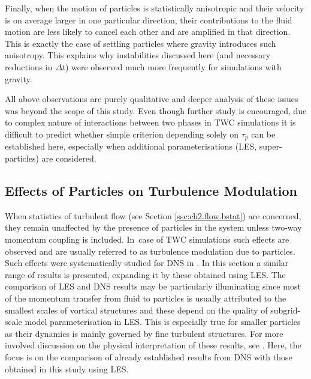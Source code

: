\documentclass{pracamgren}
\begin{document}
Finally, when the motion of particles is statistically anisotropic and their velocity is on average larger in one particular direction, their contributions to the fluid motion are less likely to cancel each other and are amplified in that direction.
This is exactly the case of settling particles where gravity introduces such anisotropy.
This explains why instabilities discussed here (and necessary reductions in $\Delta t$) were observed much more frequently for simulations with gravity.

All above observations are purely qualitative and deeper analysis of these issues was beyond the scope of this study.
Even though further study is encouraged, due to complex nature of interactions between two phases in TWC simulations it is difficult to predict whether simple criterion depending solely on $\tau_p$ can be established here, especially when additional parameterisations (LES, super-particles) are considered.



\subsection{Effects of Particles on Turbulence Modulation}
\label{ssc:ch2.flow.twc}

When statistics of turbulent flow (see Section \ref{ssc:ch2.flow.bstat}) are concerned, they remain unaffected by the presence of particles in the system unless two-way momentum coupling is included.
In~case of TWC simulations such effects are observed and are usually referred to as turbulence modulation due to particles.
Such effects were systematically studied for DNS in \textcite{Rosa2020}.
In this section a similar range of results is presented, expanding it by these obtained using LES.
The comparison of LES and DNS results may be particularly illuminating since most of the momentum transfer from fluid to particles is usually attributed to the smallest scales of vortical structures and these depend on the quality of subgrid-scale model parameterisation in LES.
This is especially true for smaller particles as their dynamics is mainly governed by fine turbulent structures. 
For more involved discussion on the physical interpretation of these results, see \textcite{Rosa2020}.
Here, the focus is on the comparison of already established results from DNS with those obtained in this study using LES.
\end{document}
